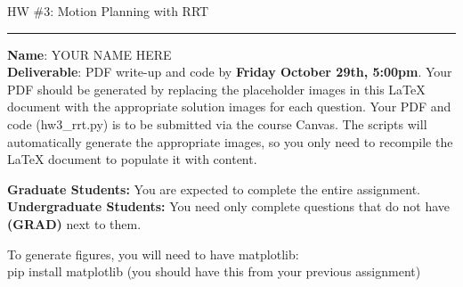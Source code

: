 \documentclass{article}
\newcommand{\ruleskip}{\bigskip\hrule\bigskip}
\begin{document}
\pagestyle{myheadings} 

{\huge
\noindent HW \#3: Motion Planning with RRT}\\
\ruleskip
{\bf Name}: YOUR NAME HERE\\

{\bf Deliverable}:  PDF write-up and code by {\bf Friday October 29th, 5:00pm}.  Your PDF should be generated by replacing the placeholder images in this LaTeX document with the appropriate solution images for each question.  Your PDF and code (hw3\_rrt.py) is to be submitted via the course Canvas. The scripts will automatically generate the appropriate images, so you only need to recompile the LaTeX document to populate it with content.

\textbf{Graduate Students:} You are expected to complete the entire assignment.\\
\textbf{Undergraduate Students:} You need only complete questions that do not have \textbf{(GRAD)} next to them.\\

\vspace{.1in}

To generate figures, you will need to have matplotlib:\\
pip install matplotlib (you should have this from your previous assignment)\\


\newpage
\end{document}
